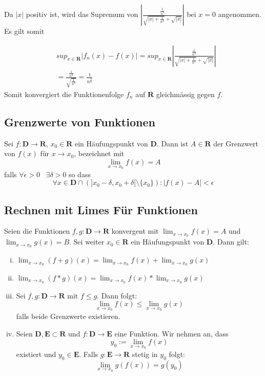 \documentclass[8pt]{article}
\begin{document}
\begin{multicols*}{3}
Da $|x|$ positiv ist, wird das Supremum von $\left|\frac{\frac{1}{n^3}}{\sqrt{|x| + \frac{1}{n^3}} + \sqrt{|x|}}\right|$ bei $x = 0$ angenommen. Es gilt somit

\begin{align*}
 & sup_{x \in \mathbf{R}} |f_n(x) - f(x)| = sup_{x \in \mathbf{R}} \left|\frac{\frac{1}{n^3}}{\sqrt{|x| + \frac{1}{n^3}} + \sqrt{|x|}}\right|\\
  &= \frac{\frac{1}{n^3}}{\sqrt{\frac{1}{n^3}}} = \frac{1}{n^{\frac{3}{2}}}
\end{align*}
Somit konvergiert die Funktionenfolge $f_n$ auf $\mathbf{R}$ gleichmässig gegen $f$.




  \subsection {Grenzwerte von Funktionen}
Sei $f:\mathbf{D} \rightarrow \mathbf{R}$, $x_0 \in \mathbf{R}$ ein Häufungspunkt von $\mathbf{D}$.
Dann ist $A \in \mathbf{R}$ der Grenzwert von $f(x)$ für $x \rightarrow x_0$, bezeichnet mit
$$
  \lim_{x \rightarrow x_0} f(x) = A
$$
falls $\forall \epsilon > 0 \;\;\; \exists \delta > 0$ so dass
$$
  \forall x \in \mathbf{D} \cap (]x_0-\delta, x_0 + \delta[ \setminus \{x_0\}) : |f(x) - A| < \epsilon
$$
\subsection{Rechnen mit Limes Für Funktionen}
Seien die Funktionen $f, g: \mathbf{D} \rightarrow \mathbf{R}$ konvergent mit
$\lim_{x \rightarrow x_0} f(x) = A$ und $\lim_{x \rightarrow x_0} g(x) = B$. Sei weiter
$x_0 \in \mathbf{R}$ ein Häufungspunkt von $\mathbf{D}$.
Dann gilt:
\begin{enumerate}[(i)]
  \item $\lim_{x \rightarrow x_0} (f + g)(x) = \lim_{x \rightarrow x_0} f(x) + \lim_{x \rightarrow x_0} g(x)$
  \item $\lim_{x \rightarrow x_0} (f * g)(x) = \lim_{x \rightarrow x_0} f(x) * \lim_{x \rightarrow x_0} g(x)$
  \item Sei $f, g: \mathbf{D} \rightarrow \mathbf{R} \text{ mit } f \leq g$. Dann folgt:
  $$
    \lim_{x \rightarrow x_0} f(x) \leq \lim_{x \rightarrow x_0} g(x)
  $$
  falls beide Grenzwerte existieren.
  \item Seien $\mathbf{D}, \mathbf{E} \subset \mathbf{R}$ und $f: \mathbf{D} \rightarrow \mathbf{E}$ eine Funktion. Wir nehmen an, dass $$y_0 := \lim_{x \rightarrow x_0} f(x)$$ existiert
  und $y_0 \in \mathbf{E}$. Falls $g:\mathbf{E} \rightarrow \mathbf{R}$ stetig in $y_0$ folgt:
  $$\lim_{x \rightarrow x_0} g(f(x)) = g(y_0)$$
\end{enumerate}

\end{multicols*}
\end{document}
